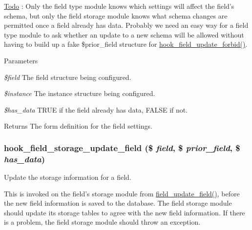 \begin{Desc}
\item[\hyperlink{todo__todo000015}{Todo}]: Only the field type module knows which settings will affect the field's schema, but only the field storage module knows what schema changes are permitted once a field already has data. Probably we need an easy way for a field type module to ask whether an update to a new schema will be allowed without having to build up a fake \$prior\_\-field structure for \hyperlink{group__field__crud_ga7bd0ccd40a9a3690b697b68d03f660a4}{hook\_\-field\_\-update\_\-forbid()}.\end{Desc}

\begin{DoxyParams}{Parameters}
\item[{\em \$field}]The field structure being configured. \item[{\em \$instance}]The instance structure being configured. \item[{\em \$has\_\-data}]TRUE if the field already has data, FALSE if not.\end{DoxyParams}
\begin{DoxyReturn}{Returns}
The form definition for the field settings. 
\end{DoxyReturn}
\hypertarget{group__field__types_gae38c5e194a4bf43e2af3dba6b62da25b}{
\subsubsection[{hook\_\-field\_\-storage\_\-update\_\-field}]{\setlength{\rightskip}{0pt plus 5cm}hook\_\-field\_\-storage\_\-update\_\-field (\$ {\em field}, \/  \$ {\em prior\_\-field}, \/  \$ {\em has\_\-data})}}
\label{group__field__types_gae38c5e194a4bf43e2af3dba6b62da25b}
Update the storage information for a field.

This is invoked on the field's storage module from \hyperlink{group__field__crud_gacca7d1f76963048aa84b1c9a271876f5}{field\_\-update\_\-field()}, before the new field information is saved to the database. The field storage module should update its storage tables to agree with the new field information. If there is a problem, the field storage module should throw an exception.


